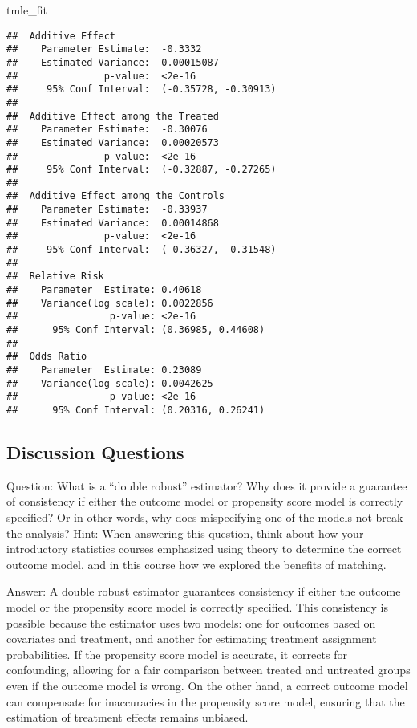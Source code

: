 \documentclass[
]{article}
\newenvironment{Shaded}{\begin{snugshade}}{\end{snugshade}}
\newcommand{\NormalTok}[1]{#1}
\begin{document}
\begin{Shaded}
\begin{Highlighting}[]
\NormalTok{tmle\_fit}
\end{Highlighting}
\end{Shaded}

\begin{verbatim}
##  Additive Effect
##    Parameter Estimate:  -0.3332
##    Estimated Variance:  0.00015087
##               p-value:  <2e-16
##     95% Conf Interval:  (-0.35728, -0.30913)
## 
##  Additive Effect among the Treated
##    Parameter Estimate:  -0.30076
##    Estimated Variance:  0.00020573
##               p-value:  <2e-16
##     95% Conf Interval:  (-0.32887, -0.27265)
## 
##  Additive Effect among the Controls
##    Parameter Estimate:  -0.33937
##    Estimated Variance:  0.00014868
##               p-value:  <2e-16
##     95% Conf Interval:  (-0.36327, -0.31548)
## 
##  Relative Risk
##    Parameter  Estimate: 0.40618
##    Variance(log scale): 0.0022856
##                p-value: <2e-16
##      95% Conf Interval: (0.36985, 0.44608)
## 
##  Odds Ratio
##    Parameter  Estimate: 0.23089
##    Variance(log scale): 0.0042625
##                p-value: <2e-16
##      95% Conf Interval: (0.20316, 0.26241)
\end{verbatim}

\hypertarget{discussion-questions-1}{%
\subsection{Discussion Questions}\label{discussion-questions-1}}

Question: What is a ``double robust'' estimator? Why does it provide a
guarantee of consistency if either the outcome model or propensity score
model is correctly specified? Or in other words, why does mispecifying
one of the models not break the analysis? Hint: When answering this
question, think about how your introductory statistics courses
emphasized using theory to determine the correct outcome model, and in
this course how we explored the benefits of matching.

Answer: A double robust estimator guarantees consistency if either the
outcome model or the propensity score model is correctly specified. This
consistency is possible because the estimator uses two models: one for
outcomes based on covariates and treatment, and another for estimating
treatment assignment probabilities. If the propensity score model is
accurate, it corrects for confounding, allowing for a fair comparison
between treated and untreated groups even if the outcome model is wrong.
On the other hand, a correct outcome model can compensate for
inaccuracies in the propensity score model, ensuring that the estimation
of treatment effects remains unbiased.
\end{document}
